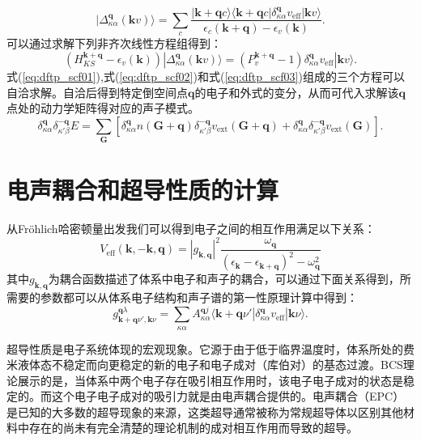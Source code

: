 \begin{equation}\label{eq:dftp_scf02}
  | \Delta^{\bm{q}}_{\kappa\alpha}(\bm{k}v) \rangle =
  \sum_c \frac{|\bm{k}+\bm{q}c\rangle \langle \bm{k}+\bm{q}c | \delta^{\bm{q}}_{\kappa\alpha} v_\mathrm{eff} | \bm{k}v \rangle}
  {\epsilon_c(\bm{k}+\bm{q})-\epsilon_v(\bm{k})}.
\end{equation}
可以通过求解下列非齐次线性方程组得到：
\begin{equation}\label{eq:dftp_scf03}
  (H^{\bm{k}+\bm{q}}_{KS}-\epsilon_v(\bm{k}))|\Delta^{\bm{q}}_{\kappa\alpha}(\bm{k}v)\rangle =
  (P^{\bm{k}+\bm{q}}_v-1)\delta^{\bm{q}}_{\kappa\alpha}v_\mathrm{eff}|\bm{k}v\rangle .
\end{equation}
式(\ref{eq:dftp_scf01}),式(\ref{eq:dftp_scf02})和式(\ref{eq:dftp_scf03})组成的三个方程可以自洽求解。自洽后得到特定倒空间点$\bm{q}$的电子和外式的变分，从而可代入求解该$\bm{q}$点处的动力学矩阵得对应的声子模式。
\begin{equation}
  \delta^{\bm{q}}_{\kappa\alpha}\delta^{-\bm{q}}_{\kappa'\beta} E =
  \sum_{\bm{G}} [ \delta^{\bm{q}}_{\kappa\alpha}n(\bm{G}+\bm{q})\delta^{\bm{-q}}_{\kappa'\beta}v_\mathrm{ext}(\bm{G}+\bm{q}) + \delta^{\bm{q}}_{\kappa\alpha}\delta^{\bm{-q}}_{\kappa'\beta} v_\mathrm{ext}(\bm{G})].
\end{equation}

\section{电声耦合和超导性质的计算}
从Fr{\"o}hlich哈密顿量\cite{frohlich1954theory}出发我们可以得到电子之间的相互作用满足以下关系：
\begin{equation}
  V_{\mathrm{eff}}(\bm{k},-\bm{k},\bm{q}) = |g_{\bm{k},\bm{q}}|^2
  \frac{\omega_{\bm{q}}}{(\epsilon_{\bm{k}}-\epsilon_{\bm{k}+\bm{q}})^2-\omega^2_{\bm{q}}}
\end{equation}
其中$g_{\bm{k},\bm{q}}$为耦合函数描述了体系中电子和声子的耦合，可以通过下面关系得到，所需要的参数都可以从体系电子结构和声子谱的第一性原理计算中得到：
\begin{equation}\label{eq:coupling_coeff}
  g^{\bm{q}\lambda}_{\bm{k}+\bm{q}\nu',\bm{k}\nu} =
  \sum_{\kappa\alpha} A^{\bm{q}j}_{\kappa\alpha}
  \langle {\bm{k}+\bm{q}\nu'} | {\delta^{\bm{q}}_{\kappa\alpha}v_{\mathrm{eff}}} | {\bm{k}\nu} \rangle .
\end{equation}

超导性质是电子系统体现的宏观现象。它源于由于低于临界温度时，体系所处的费米液体态不稳定而向更稳定的新的电子和电子成对（库伯对）的基态过渡。BCS理论\cite{bardeen1957theory}展示的是，当体系中两个电子存在吸引相互作用时，该电子电子成对的状态是稳定的。而这个电子电子成对的吸引力就是由电声耦合提供的。电声耦合（EPC）是已知的大多数的超导现象的来源，这类超导通常被称为常规超导体以区别其他材料中存在的尚未有完全清楚的理论机制的成对相互作用而导致的超导。

